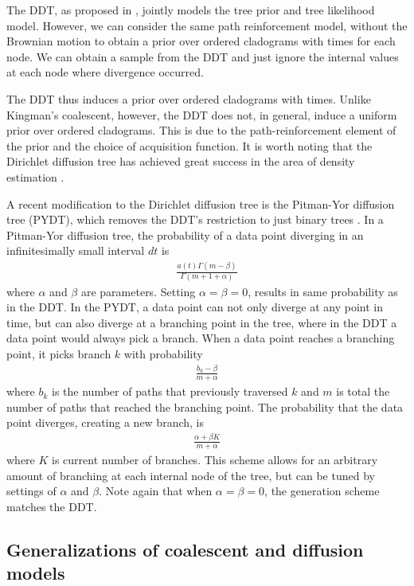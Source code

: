 The DDT, as proposed in \citet{Neal2003}, 
jointly models the tree prior and tree likelihood model.
However, we can consider the same
path reinforcement model, without the Brownian motion
to obtain a prior over ordered cladograms
with times for each node.
We can obtain a sample from the DDT and just ignore the
internal values at each node where divergence occurred.

The DDT thus induces a prior over ordered cladograms
with times.
Unlike Kingman's coalescent, however, the DDT
does not, in general, induce a uniform prior over ordered cladograms.
This is due to the path-reinforcement element
of the prior and the choice of acquisition function.
It is worth noting that the Dirichlet diffusion tree has achieved
great success in the area of density estimation \citep{Adams2008}.

A recent modification to the Dirichlet diffusion tree
is the Pitman-Yor diffusion tree (PYDT),
which removes the DDT's restriction to just binary trees
\citep{Knowles2015}.
In a Pitman-Yor diffusion tree, the probability
of a data point diverging in an infinitesimally small
interval $dt$ is
\begin{align}
  \frac{a(t)\Gamma(m - \beta)}{\Gamma(m + 1 + \alpha)}
\end{align}
where $\alpha$ and $\beta$ are parameters. Setting $\alpha = \beta = 0$,
results in same probability as in the DDT.
In the PYDT, a data point can not only
diverge at any point in time,
but can also diverge at a branching point
in the tree, where in the DDT
a data point would always pick a branch.
When a data point reaches a branching point,
it picks branch $k$
with probability
\begin{align}
  \frac{b_k - \beta}{m + \alpha}
\end{align}
where $b_k$ is the number of paths
that previously traversed $k$
and $m$ is total the number of paths
that reached the branching point.
The probability that the data point
diverges, creating a new branch, is
\begin{align}
  \frac{\alpha + \beta K}{m + \alpha}
\end{align}
where $K$ is current number of branches.
This scheme allows for an arbitrary amount of
branching at each internal node of the tree,
but can be tuned by settings of $\alpha$ and $\beta$.
Note again that when $\alpha = \beta = 0$,
the generation scheme matches the DDT.

\subsection{Generalizations of coalescent and diffusion models}

